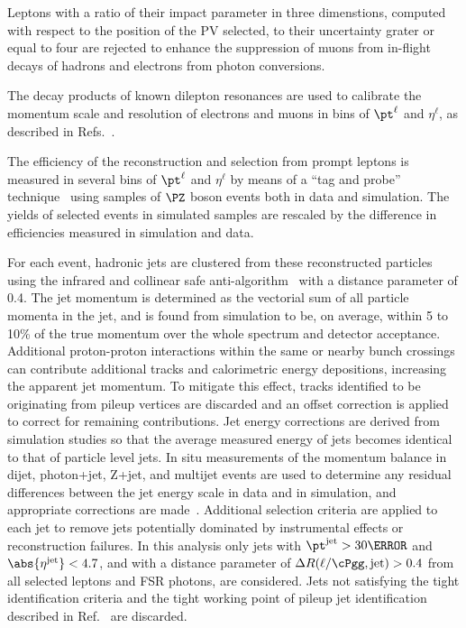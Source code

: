 Leptons with a ratio of their impact parameter in three dimenstions, computed with respect to the position of the PV selected, to their uncertainty grater or equal to four are rejected to enhance the suppression of muons from in-flight decays of hadrons and electrons from photon conversions.

The decay products of known dilepton resonances are used to calibrate the momentum scale and resolution of electrons and muons in bins of $\pt^{\ell}$ and $\eta^{\ell}$, as described in Refs.~\cite{EGM-17-001,Sirunyan:2018}.

The efficiency of the reconstruction and selection from prompt leptons is measured in several bins of $\pt^{\ell}$ and $\eta^{\ell}$ by means of a ``tag and probe'' technique~\cite{CMS:2011aa} using samples of $\PZ$ boson events both in data and simulation. The yields of selected events in simulated samples are rescaled by the difference in efficiencies measured in simulation and data.

For each event, hadronic jets are clustered from these reconstructed particles using the infrared and collinear safe anti-\kt algorithm~\cite{Cacciari:2008gp, Cacciari:2011ma} with a distance parameter of 0.4. The jet momentum is determined as the vectorial sum of all particle momenta in the jet, and is found from simulation to be, on average, within 5 to 10\% of the true momentum over the whole \pt spectrum and detector acceptance. Additional proton-proton interactions within the same or nearby bunch crossings can contribute additional tracks and calorimetric energy depositions, increasing the apparent jet momentum. To mitigate this effect, tracks identified to be originating from pileup vertices are discarded and an offset correction is applied to correct for remaining contributions. Jet energy corrections are derived from simulation studies so that the average measured energy of jets becomes identical to that of particle level jets. In situ measurements of the momentum balance in dijet, photon+jet, Z+jet, and multijet events are used to determine any residual differences between the jet energy scale in data and in simulation, and appropriate corrections are made~\cite{Khachatryan:2016kdb}. Additional selection criteria are applied to each jet to remove jets potentially dominated by instrumental effects or reconstruction failures. In this analysis only jets with $\pt^{\text{jet}}>30\GeV$
and $\abs{\eta^{\text{jet}}} < 4.7$, and with a distance parameter of $\Delta R(\ell/\cPgg,\text{jet})>0.4$ from all selected leptons and FSR photons, are considered. Jets not satisfying the tight identification criteria and the tight working point of pileup jet identification described in Ref.~\cite{PUmitigationCMS} are discarded.

